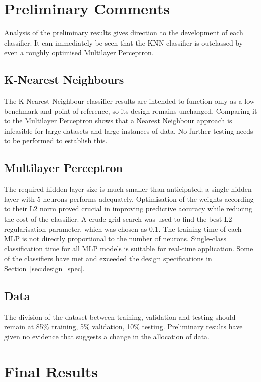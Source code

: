 \section{Preliminary Comments}
Analysis of the preliminary results gives direction to the development of each classifier. It can immediately be seen that the KNN classifier is outclassed by even a roughly optimised Multilayer Perceptron. 

\subsection{K-Nearest Neighbours}\label{sec:knn_results}
The K-Nearest Neighbour classifier results are intended to function only as a low benchmark and point of reference, so its design remains unchanged. Comparing it to the Multilayer Perceptron shows that a Nearest Neighbour approach is infeasible for large datasets and large instances of data. No further testing needs to be performed to establish this.

\subsection{Multilayer Perceptron}

The required hidden layer size is much smaller than anticipated; a single hidden layer with 5 neurons performs adequately. Optimisation of the weights according to their L2 norm proved crucial in improving predictive accuracy while reducing the cost of the classifier. A crude grid search was used to find the best L2 regularisation parameter, which was chosen as 0.1. The training time of each MLP is not directly proportional to the number of neurons. Single-class classification time for all MLP models is suitable for real-time application. Some of the classifiers have met and exceeded the design specifications in Section~\ref{sec:design_spec}.

\subsection{Data}
The division of the dataset between training, validation and testing should remain at 85\% training, 5\% validation, 10\% testing. Preliminary results have given no evidence that suggests a change in the allocation of data.


\section{Final Results}

